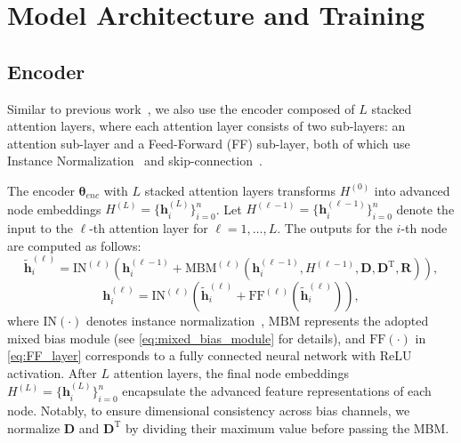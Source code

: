 \documentclass{article}
\theoremstyle{plain}
\theoremstyle{definition}
\theoremstyle{remark}
\begin{document}
\clearpage
\section{Model Architecture and Training}
\label{append:model_architecture}

\subsection{Encoder}
\label{append:encoder}
Similar to previous work~\citep{kool2019attention,kwon2020pomo}, we also use the encoder composed of $L$ stacked attention layers, where each attention layer consists of two sub-layers: an attention sub-layer and a Feed-Forward (FF) sub-layer, both of which use Instance Normalization~\citep{ulyanov2016instanceNorm} and skip-connection~\citep{he2016skip}.

The encoder $\bm{\theta}_{enc}$ with $L$ stacked attention layers transforms $H^{(0)}$ into advanced node embeddings $H^{(L)}=\{\mathbf{h}_i^{(L)}\}_{i=0}^n$. Let ${H}^{(\ell-1)} = \{\mathbf{h}_{i}^{(\ell-1)}\}_{i=0}^{n}$ denote the input to the $\ell$-th attention layer for $\ell = 1, \ldots, L$. The outputs for the $i$-th node are computed as follows:
\begin{equation}
\widetilde{\mathbf{h}}_i^{(\ell)} = \mathrm{IN}^{(\ell)}\left(\mathbf{h}_i^{(\ell-1)} + \mathrm{MBM}^{(\ell)}\left(\mathbf{h}_i^{(\ell-1)},H^{(\ell-1)}, \bm{D},\bm{D}^{\mathrm{T}},\bm{R}\right)\right),
\label{eq:attention_layer_mbm}
\end{equation}
\begin{equation}
    \mathbf{h}_i^{(\ell)} = \mathrm{IN}^{(\ell)}\left(\mathbf{\widetilde{h}}_i^{(\ell)} + \mathrm{FF}^{(\ell)}\left(\mathbf{\widetilde{h}}_i^{(\ell)}\right)\right),
\label{eq:FF_layer}
\end{equation}
where $\mathrm{IN}(\cdot)$ denotes instance normalization~\citep{ulyanov2016instanceNorm}, $\mathrm{MBM}$ represents the adopted mixed bias module (see \cref{eq:mixed_bias_module} for details), and $\mathrm{FF}(\cdot)$ in \cref{eq:FF_layer} corresponds to a fully connected neural network with ReLU activation. After $L$ attention layers, the final node embeddings $H^{(L)}=\{\mathbf{h}_i^{(L)}\}_{i=0}^n$ encapsulate the advanced feature representations of each node. Notably, to ensure dimensional consistency across bias channels, we normalize $\bm{D}$ and $\bm{D^{\mathrm{T}}}$ by dividing their maximum value before passing the MBM. 
\end{document}
